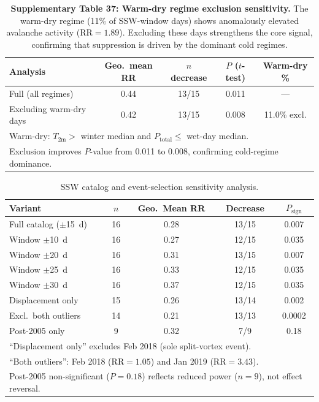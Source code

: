 \begin{table}[h!]
\centering
\caption{\textbf{Supplementary Table 37: Warm-dry regime exclusion sensitivity.} The warm-dry regime (11\% of SSW-window days) shows anomalously elevated avalanche activity ($\mathrm{RR} = 1.89$). Excluding these days strengthens the core signal, confirming that suppression is driven by the dominant cold regimes.}
\label{tab:warm_dry_excl}
\begin{tabular}{lcccc}
\toprule
Analysis & Geo.\ mean RR & $n$ decrease & $P$ ($t$-test) & Warm-dry \% \\
\midrule
Full (all regimes) & 0.44 & 13/15 & 0.011 & --- \\
Excluding warm-dry days & 0.42 & 13/15 & 0.008 & 11.0\% excl. \\
\bottomrule
\multicolumn{5}{l}{\footnotesize Warm-dry: $T_{\mathrm{2m}} > $ winter median and $P_{\mathrm{total}} \leq$ wet-day median.} \\
\multicolumn{5}{l}{\footnotesize Exclusion improves $P$-value from 0.011 to 0.008, confirming cold-regime dominance.} \\
\end{tabular}
\end{table}

\begin{table}[htbp]
\centering
\caption{SSW catalog and event-selection sensitivity analysis.}
\label{tab:ssw_catalog}
\begin{tabular}{lcccc}
\hline
Variant & $n$ & Geo.\ Mean RR & Decrease & $P_{\mathrm{sign}}$ \\
\hline
Full catalog ($\pm$15~d) & 16 & 0.28 & 13/15 & 0.007 \\
Window $\pm$10~d & 16 & 0.27 & 12/15 & 0.035 \\
Window $\pm$20~d & 16 & 0.31 & 13/15 & 0.007 \\
Window $\pm$25~d & 16 & 0.33 & 12/15 & 0.035 \\
Window $\pm$30~d & 16 & 0.37 & 12/15 & 0.035 \\
Displacement only & 15 & 0.26 & 13/14 & 0.002 \\
Excl.\ both outliers & 14 & 0.21 & 13/13 & 0.0002 \\
Post-2005 only & 9 & 0.32 & 7/9 & 0.18 \\
\hline
\multicolumn{5}{l}{\footnotesize ``Displacement only'' excludes Feb 2018 (sole split-vortex event).} \\
\multicolumn{5}{l}{\footnotesize ``Both outliers'': Feb 2018 ($\mathrm{RR}=1.05$) and Jan 2019 ($\mathrm{RR}=3.43$).} \\
\multicolumn{5}{l}{\footnotesize Post-2005 non-significant ($P=0.18$) reflects reduced power ($n=9$), not effect reversal.} \\
\end{tabular}
\end{table}

